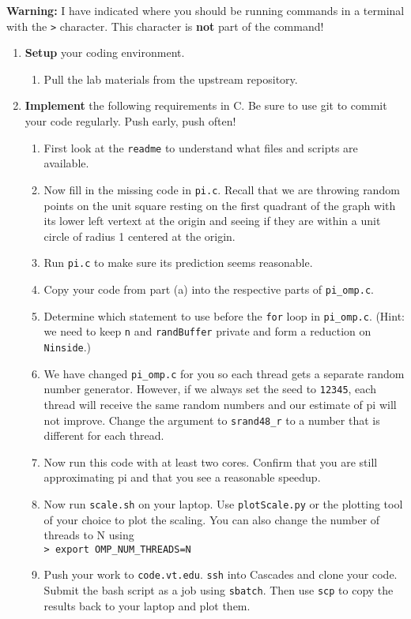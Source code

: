 \documentclass[letter]{article}
\begin{document}
\textbf{Warning:} I have indicated where you should be running commands in a terminal with the \texttt{>} character.  This character is \textbf{not} part of the command!

\begin{enumerate}

    \item \textbf{Setup} your coding environment.
        \begin{enumerate}
            \item Pull the lab materials from the upstream repository.
        \end{enumerate}

    \item \textbf{Implement} the following requirements in C.  Be sure to use git to commit your code regularly.  Push early, push often!
        \begin{enumerate}
            \item First look at the \texttt{readme} to understand what files and scripts are available.
            \item Now fill in the missing code in \texttt{pi.c}. Recall that we are throwing random points on the unit square resting on the first quadrant of the graph with its lower left vertext at the origin and seeing if they are within a unit circle of radius 1 centered at the origin. 
            \item Run \texttt{pi.c} to make sure its prediction seems reasonable.
            \item Copy your code from part (a) into the respective parts of \texttt{pi\_omp.c}.
            \item Determine which statement to use before the \texttt{for} loop in \texttt{pi\_omp.c}. (Hint: we need to keep \texttt{n} and \texttt{randBuffer} private and form a reduction on \texttt{Ninside}.)
            \item We have changed \texttt{pi\_omp.c} for you so each thread gets a separate random number generator.  However, if we always set the seed to \texttt{12345}, each thread will receive the same random numbers and our estimate of pi will not improve.  Change the argument to \texttt{srand48\_r} to a number that is different for each thread.  
            \item Now run this code with at least two cores. Confirm that you are still approximating pi and that you see a reasonable speedup.
            \item Now run \texttt{scale.sh} on your laptop. Use \texttt{plotScale.py} or the plotting tool of your choice to plot the scaling.  You can also change the number of threads to N using\\
            \texttt{> export OMP\_NUM\_THREADS=N} 
            \item Push your work to \texttt{code.vt.edu}. \texttt{ssh} into Cascades and clone your code. Submit the bash script as a job using \texttt{sbatch}. Then use \texttt{scp} to copy the results back to your laptop and plot them.  
        \end{enumerate}
            

\end{enumerate}
\end{document}
